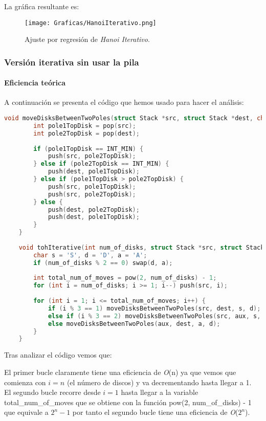 \documentclass[a4paper,12pt]{article} %
\begin{document}
La gráfica resultante es:
\begin{figure}[H]
	\centering
	\texttt{[image: Graficas/HanoiIterativo.png]}
	\caption{Ajuste por regresión de \textit{Hanoi Iterativo}.}
\end{figure}


\subsubsection{Versión iterativa sin usar la pila}

\paragraph{Eficiencia teórica}

A continuación se presenta el código que hemos usado para hacer el análisis:

\begin{lstlisting}[language=C, caption={Código de Hanoi Iterativo sin pila}]
	void moveDisksBetweenTwoPoles(struct Stack *src, struct Stack *dest, char s, char d) {
		int pole1TopDisk = pop(src);
		int pole2TopDisk = pop(dest);
	
		if (pole1TopDisk == INT_MIN) {
			push(src, pole2TopDisk);
		} else if (pole2TopDisk == INT_MIN) {
			push(dest, pole1TopDisk);
		} else if (pole1TopDisk > pole2TopDisk) {
			push(src, pole1TopDisk);
			push(src, pole2TopDisk);
		} else {
			push(dest, pole2TopDisk);
			push(dest, pole1TopDisk);
		}
	}
	
	void tohIterative(int num_of_disks, struct Stack *src, struct Stack *aux, struct Stack *dest) {
		char s = 'S', d = 'D', a = 'A';
		if (num_of_disks % 2 == 0) swap(d, a);
	
		int total_num_of_moves = pow(2, num_of_disks) - 1;
		for (int i = num_of_disks; i >= 1; i--) push(src, i);
	
		for (int i = 1; i <= total_num_of_moves; i++) {
			if (i % 3 == 1) moveDisksBetweenTwoPoles(src, dest, s, d);
			else if (i % 3 == 2) moveDisksBetweenTwoPoles(src, aux, s, a);
			else moveDisksBetweenTwoPoles(aux, dest, a, d);
		}
	}
\end{lstlisting}

Tras analizar el código vemos que:

El primer bucle claramente tiene una eficiencia de \textit{O}(n) ya que vemos que comienza con $i=n$ (el número de discos)
y va decrementando hasta llegar a 1.\\

El segundo bucle recorre desde $i=1$ hasta llegar a la variable total\_num\_of\_moves que se obtiene con la función
pow(2, num\_of\_disks) - 1 que equivale a $2^n - 1$ por tanto el segundo bucle tiene una eficiencia de \textit{O}($2^n$).\\
\end{document}
